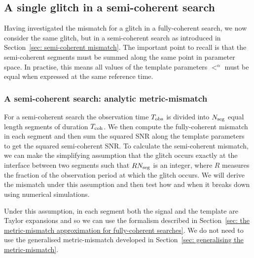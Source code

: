 \documentclass[../full_thesis/full_thesis.tex]{subfiles}
\begin{document}
\subsection{A single glitch in a semi-coherent search}

Having investigated the mismatch for a glitch in a fully-coherent search, we
now consider the same glitch, but in a semi-coherent search as introduced in
Section~\ref{sec: semi-coherent mismatch}. The important
point to recall is that the semi-coherent segments must be summed along the
same point in parameter space. In practise, this means all values of the
template parameters $\lt^{\alpha}$ must be equal when expressed at the same
reference time.

\subsubsection{A semi-coherent search: analytic metric-mismatch}
\label{sec: semi-coherent searches: analytic mismatch}

For a semi-coherent search the observation time $T_{\mathrm{obs}}$ is
divided into $N_{\textrm{seg}}$ equal length segments of duration $T_{\mathrm{coh}}$. We then compute
the fully-coherent mismatch in each segment and then sum the squared SNR along the template
parameters to get the squared semi-coherent SNR. To calculate
the semi-coherent mismatch, we can make the simplifying assumption that the
glitch occurs exactly at the interface between two segments such that $RN_{\textrm{seg}}$
is an integer, where $R$ measures the fraction of the observation period at
which the glitch occurs. We will derive the mismatch under this assumption and
then test how and when it breaks down using numerical simulations.

Under this assumption, in each segment both the signal and the template are
Taylor expansions and so we can use the \citet{Brady1998} formalism described
in Section~\ref{sec: the metric-mismatch approximation for fully-coherent
searches}. We do not need to use the generalised metric-mismatch developed in
Section~\ref{sec: generalising the metric-mismatch}.
\end{document}
